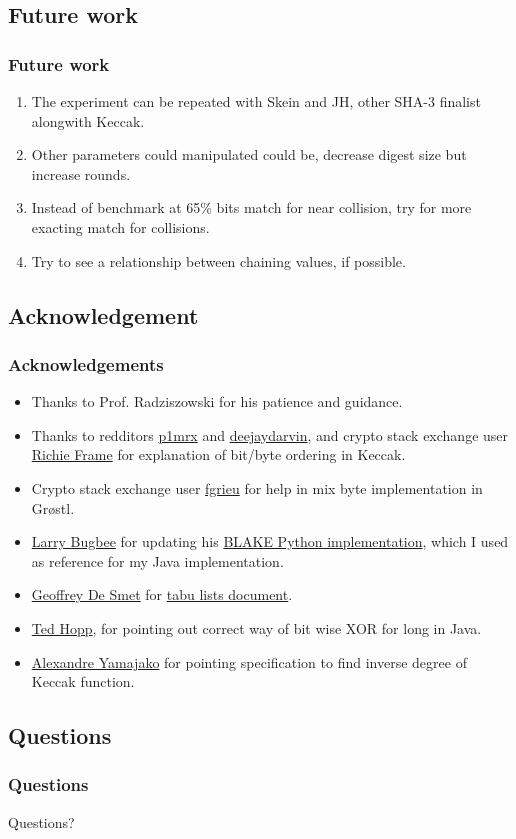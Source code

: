 \documentclass{beamer}
\begin{document}
\subsection{Future work}

\begin{frame}
\frametitle{Future work}
\begin{enumerate}
\item The experiment can be repeated with Skein and JH, other SHA-3 finalist alongwith Keccak.
\item Other parameters could manipulated could be, decrease digest size but increase rounds.
\item Instead of benchmark at 65\% bits match for near collision, try for more exacting match
for collisions.
\item Try to see a relationship between chaining values, if possible.
\end{enumerate}
\end{frame}

\subsection{Acknowledgement}

\begin{frame}
\frametitle{Acknowledgements}
\begin{itemize}
\item Thanks to Prof. Radziszowski for his patience and guidance.
\item Thanks to redditors \href{"http://www.reddit.com/user/p1mrx"}{p1mrx} and 
\href{"http://www.reddit.com/user/deejaydarvin"}{deejaydarvin}, and crypto stack exchange user 
\href{"http://crypto.stackexchange.com/users/8050/richie-frame"}{Richie Frame} for explanation of bit/byte 
ordering in Keccak.
\item Crypto stack exchange user \href{"http://crypto.stackexchange.com/users/555/fgrieu"}{fgrieu} for help
in mix byte implementation in Gr{\o}stl.
\item \href{"http://www.seanet.com/~bugbee"}{Larry Bugbee} for updating his 
\href{http://www.seanet.com/~bugbee/crypto/blake/}{BLAKE Python implementation}, which I used as reference 
for my Java implementation.
\item \href{"http://stackoverflow.com/users/472109/geoffrey-de-smet"}{Geoffrey De Smet} for 
\href{"http://docs.jboss.org/drools/release/latest/optaplanner-docs/html\_single/index.html\#tabuSearch"}
{tabu lists document}.
\item \href{"http://stackoverflow.com/users/535871/ted-hopp"}{Ted Hopp}, for pointing out correct way
of bit wise XOR for long in Java.
\item \href{"http://crypto.stackexchange.com/users/4136/alexandre-yamajako"}{Alexandre Yamajako} for pointing
specification to find inverse degree of Keccak function.
\end{itemize}
\end{frame}

\subsection{Questions}

\begin{frame}
\frametitle{Questions}
Questions?
\end{frame}
\end{document}
